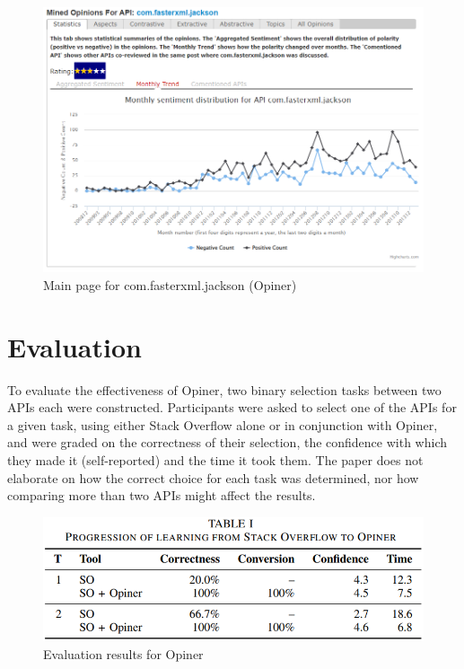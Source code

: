 \documentclass[a4paper,10pt, bibliography=totocnumbered]{scrreprt}
\begin{document}
\begin{figure}[!h]
    \includegraphics[scale=0.6]{../images/Thema9_OpinerTool0.PNG}
    \caption{Main page for com.fasterxml.jackson (Opiner)}
    \label{OpinerTool0}
\end{figure}

\pagebreak

\section{Evaluation}

To evaluate the effectiveness of Opiner, two binary selection tasks between two APIs each were constructed. Participants were asked to select one of the APIs for a given task, using either Stack Overflow alone or in conjunction with Opiner, and were graded on the correctness of their selection, the confidence with which they made it (self-reported) and the time it took them. The paper does not elaborate on how the correct choice for each task was determined, nor how comparing more than two APIs might affect the results.

\begin{figure}[!h]
    \centering
    \includegraphics[scale=0.6]{../images/Thema9_OpinerEval.PNG}
    \caption{Evaluation results for Opiner}
    \label{OpinerEval0}
\end{figure}
\end{document}
